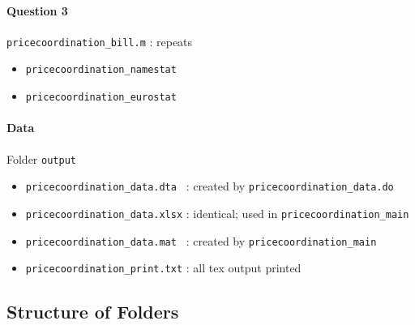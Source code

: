 \paragraph{Question 3} \texttt{pricecoordination\_bill.m} : repeats 
\begin{itemize}
	\item \texttt{pricecoordination\_namestat}
	\item \texttt{pricecoordination\_eurostat}
\end{itemize}

\paragraph{Data} Folder \texttt{output}
\begin{itemize}
	\item \texttt{pricecoordination\_data.dta } : created by \texttt{pricecoordination\_data.do}
	\item \texttt{pricecoordination\_data.xlsx} : identical; used in \texttt{pricecoordination\_main}
	\item \texttt{pricecoordination\_data.mat } : created by \texttt{pricecoordination\_main}
	\item \texttt{pricecoordination\_print.txt} : all tex output printed
\end{itemize}

\subsection{Structure of Folders}

